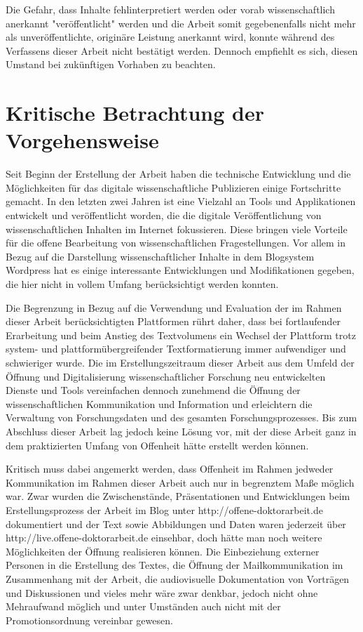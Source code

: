 Die Gefahr, dass Inhalte fehlinterpretiert werden oder vorab wissenschaftlich anerkannt "veröffentlicht" werden und die Arbeit somit gegebenenfalls nicht mehr als unveröffentlichte, originäre Leistung anerkannt wird, konnte während des Verfassens dieser Arbeit nicht bestätigt werden. Dennoch empfiehlt es sich, diesen Umstand bei zukünftigen Vorhaben zu beachten.

\section{Kritische Betrachtung der Vorgehensweise}

Seit Beginn der Erstellung der Arbeit haben die technische Entwicklung und die Möglichkeiten für das digitale wissenschaftliche Publizieren einige Fortschritte gemacht. In den letzten zwei Jahren ist eine Vielzahl an Tools und Applikationen entwickelt und veröffentlicht worden, die die digitale Veröffentlichung von wissenschaftlichen Inhalten im Internet fokussieren. Diese bringen viele Vorteile für die offene Bearbeitung von wissenschaftlichen Fragestellungen. Vor allem in Bezug auf die Darstellung wissenschaftlicher Inhalte in dem Blogsystem Wordpress hat es einige interessante Entwicklungen und Modifikationen gegeben, die hier nicht in vollem Umfang berücksichtigt werden konnten.

Die Begrenzung in Bezug auf die Verwendung und Evaluation der im Rahmen dieser Arbeit berücksichtigten Plattformen rührt daher, dass bei fortlaufender Erarbeitung und beim Anstieg des Textvolumens ein Wechsel der Plattform trotz system- und plattformübergreifender Textformatierung immer aufwendiger und schwieriger wurde. Die im Erstellungszeitraum dieser Arbeit aus dem Umfeld der Öffnung und Digitalisierung wissenschaftlicher Forschung neu entwickelten Dienste und Tools vereinfachen dennoch zunehmend die Öffnung der wissenschaftlichen Kommunikation und Information und erleichtern die Verwaltung von Forschungsdaten und des gesamten Forschungsprozesses. Bis zum Abschluss dieser Arbeit lag jedoch keine Lösung vor, mit der diese Arbeit ganz in dem praktizierten Umfang von Offenheit hätte erstellt werden können.

Kritisch muss dabei angemerkt werden, dass Offenheit im Rahmen jedweder Kommunikation im Rahmen dieser Arbeit auch nur in begrenztem Maße möglich war. Zwar wurden die Zwischenstände, Präsentationen und Entwicklungen beim Erstellungsprozess der Arbeit im Blog unter http://offene-doktorarbeit.de dokumentiert und der Text sowie Abbildungen und Daten waren jederzeit über http://live.offene-doktorarbeit.de einsehbar, doch hätte man noch weitere Möglichkeiten der Öffnung realisieren können. Die Einbeziehung externer Personen in die Erstellung des Textes, die Öffnung der Mailkommunikation im Zusammenhang mit der Arbeit, die audiovisuelle Dokumentation von Vorträgen und Diskussionen und vieles mehr wäre zwar denkbar, jedoch nicht ohne Mehraufwand möglich und unter Umständen auch nicht mit der Promotionsordnung vereinbar gewesen.


